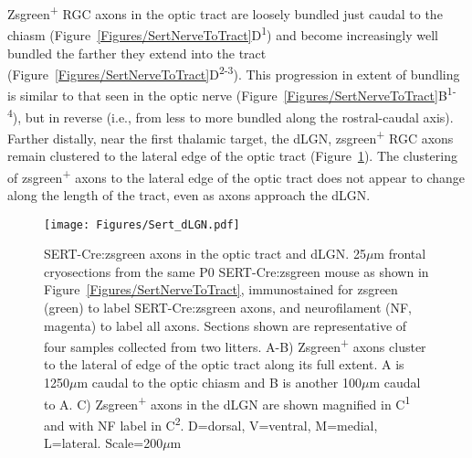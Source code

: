 Zsgreen\textsuperscript{+} RGC axons in the optic tract are loosely bundled just caudal to the chiasm (Figure~\ref{Figures/SertNerveToTract}D\textsuperscript{1}) and become increasingly well bundled the farther they extend into the tract (Figure~\ref{Figures/SertNerveToTract}D\textsuperscript{2-3}).
This progression in extent of bundling is similar to that seen in the optic nerve (Figure~\ref{Figures/SertNerveToTract}B\textsuperscript{1-4}), but in reverse (i.e., from less to more bundled along the rostral-caudal axis).
Farther distally, near the first thalamic target, the dLGN, zsgreen\textsuperscript{+} RGC axons remain clustered to the lateral edge of the optic tract (Figure~\ref{Figures/SertdLGN}).
The clustering of zsgreen\textsuperscript{+} axons to the lateral edge of the optic tract does not appear to change along the length of the tract, even as axons approach the dLGN.

\begin{figure}[hbtp]
    \begin{center}
        \texttt{[image: Figures/Sert\_dLGN.pdf]}
        \caption[SERT-Cre:zsgreen axons in the optic tract and dLGN.]
        {SERT-Cre:zsgreen axons in the optic tract and dLGN.
        25$\mu$m frontal cryosections from the same P0 SERT-Cre:zsgreen mouse as shown in Figure~\ref{Figures/SertNerveToTract}, immunostained for zsgreen (green) to label SERT-Cre:zsgreen axons, and neurofilament (NF, magenta) to label all axons.
        Sections shown are representative of four samples collected from two litters. %
        A-B) Zsgreen\textsuperscript{+} axons cluster to the lateral of edge of the optic tract along its full extent.
        A is 1250$\mu$m caudal to the optic chiasm and B is another 100$\mu$m caudal to A.
        C) Zsgreen\textsuperscript{+} axons in the dLGN are shown magnified in C\textsuperscript{1} and with NF label in C\textsuperscript{2}.
        D=dorsal, V=ventral, M=medial, L=lateral.
		Scale=200$\mu$m}
        \label{Figures/SertdLGN}
    \end{center}
\end{figure}
